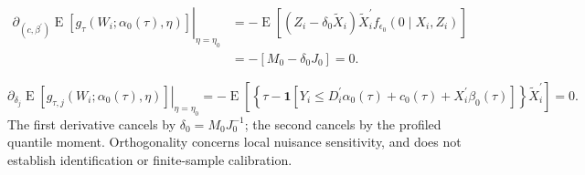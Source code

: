 \begin{equation}
    \begin{aligned}
        \left.
        \partial_{(c,\beta^{\prime})}
        \operatorname{E}\!\left[
            g_{\tau}\!\left(W_i;\alpha_0(\tau),\eta\right)
        \right]
        \right|_{\eta=\eta_0}
        &=-\operatorname{E}\!\left[
            (Z_i-\delta_0\widetilde X_i)\widetilde X_i^{\prime}
            f_{\epsilon_0}(0\mid X_i,Z_i)
        \right]\\
        &=-\left[M_0-\delta_0J_0\right]
        =0.
    \end{aligned}
    \label{eq:orthogonality-beta}
\end{equation}

\begin{equation}
    \left.
    \partial_{\delta_j}
    \operatorname{E}\!\left[
        g_{\tau,j}\!\left(W_i;\alpha_0(\tau),\eta\right)
    \right]
    \right|_{\eta=\eta_0}
    =-\operatorname{E}\!\left[
        \left\{
            \tau-\mathbf{1}\!\left[
                Y_i\leq D_i^{\prime}\alpha_0(\tau)
                +c_0(\tau)
                +X_i^{\prime}\beta_0(\tau)
            \right]
        \right\}\widetilde X_i^{\prime}
    \right]
    =0.
    \label{eq:orthogonality-delta}
\end{equation}
The first derivative cancels by $\delta_0=M_0J_0^{-1}$; the second cancels by the profiled quantile moment. Orthogonality concerns local nuisance sensitivity, and does not establish identification or finite-sample calibration.
